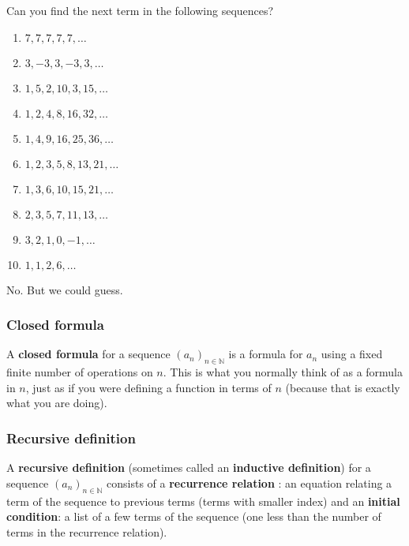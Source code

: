 \documentclass[11pt, compress]{beamer}
\newcommand{\terminology}[1]{\textbf{#1}}
\newcommand{\N}{\mathbb N}
\begin{document}
\begin{frame}
\frametitle{}
\begin{example}[2.1.1]Can you find the next term in the following sequences?
\begin{enumerate}
\item{} \(\displaystyle 7,7,7,7,7, \ldots\)

\item{} \(\displaystyle 3, -3, 3, -3, 3, \ldots\)

\item{} \(\displaystyle 1, 5, 2, 10, 3, 15, \ldots\)

\item{} \(\displaystyle 1, 2, 4, 8, 16, 32, \ldots\)

\item{} \(\displaystyle 1, 4, 9, 16, 25, 36, \ldots\)

\item{} \(\displaystyle 1, 2, 3, 5, 8, 13, 21, \ldots\)

\item{} \(\displaystyle 1, 3, 6, 10, 15, 21, \ldots\)

\item{} \(\displaystyle 2, 3, 5, 7, 11, 13, \ldots\)

\item{} \(\displaystyle 3, 2, 1, 0, -1, \ldots\)

\item{} \(\displaystyle 1, 1, 2, 6, \ldots\)
\end{enumerate}


\pause \vfill 

No.  But we could guess.
\end{example}
\end{frame}
 
\begin{frame}
\frametitle{Closed formula}
 A \terminology{closed formula}  for a sequence \((a_n)_{n\in\N}\) is a formula for \(a_n\) using a fixed finite number of operations on \(n\). This is what you normally think of as a formula in \(n\), just as if you were defining a function in terms of \(n\) (because that is exactly what you are doing).
\end{frame}
 
\begin{frame}
\frametitle{Recursive definition}
 A \terminology{recursive definition}  (sometimes called an \terminology{inductive definition}) for a sequence \((a_n)_{n\in\N}\) consists of a \terminology{recurrence relation}  : an equation relating a term of the sequence to previous terms (terms with smaller index) and an \terminology{initial condition}: a list of a few terms of the sequence (one less than the number of terms in the recurrence relation).
\end{frame}
 
\end{document}
